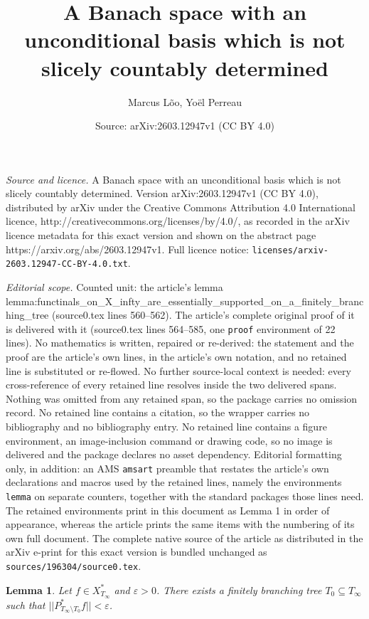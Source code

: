 \documentclass[10pt,a4paper]{amsart}
\title{A Banach space with an unconditional basis which is not slicely countably determined}
\author{Marcus L\~oo, Yo\"el Perreau}
\date{Source: arXiv:2603.12947v1 (CC BY 4.0)}
\newtheorem{lemma}{Lemma}
\begin{document}
\maketitle

\noindent\emph{Source and licence.} A Banach space with an unconditional basis which is not slicely countably determined. Version arXiv:2603.12947v1 (CC BY 4.0), distributed by arXiv under the Creative Commons Attribution 4.0 International licence, http://creativecommons.org/licenses/by/4.0/, as recorded in the arXiv licence metadata for this exact version and shown on the abstract page https://arxiv.org/abs/2603.12947v1. Full licence notice: \texttt{licenses/arxiv-2603.12947-CC-BY-4.0.txt}.\par\smallskip

\noindent\textit{Editorial scope.} Counted unit: the article's lemma lemma:functinals\_on\_X\_infty\_are\_essentially\_supported\_on\_a\_finitely\_branching\_tree (source0.tex lines 560--562). The article's complete original proof of it is delivered with it (source0.tex lines 564--585, one \texttt{proof} environment of 22 lines). No mathematics is written, repaired or re-derived: the statement and the proof are the article's own lines, in the article's own notation, and no retained line is substituted or re-flowed.  No further source-local context is needed: every cross-reference of every retained line resolves inside the two delivered spans.  Nothing was omitted from any retained span, so the package carries no omission record.  No retained line contains a citation, so the wrapper carries no bibliography and no bibliography entry.  No retained line contains a figure environment, an image-inclusion command or drawing code, so no image is delivered and the package declares no asset dependency.  Editorial formatting only, in addition: an AMS \texttt{amsart} preamble that restates the article's own declarations and macros used by the retained lines, namely the environments \texttt{lemma} on separate counters, together with the standard packages those lines need.  The retained environments print in this document as Lemma 1 in order of appearance, whereas the article prints the same items with the numbering of its own full document.  The complete native source of the article as distributed in the arXiv e-print for this exact version is bundled unchanged as \texttt{sources/196304/source0.tex}.
\begin{lemma}\label{lemma:functinals_on_X_infty_are_essentially_supported_on_a_finitely_branching_tree}
    Let $f\in X_{T_\infty}^*$ and $\varepsilon>0$. There exists a finitely branching tree $T_0\subseteq T_{\infty}$ such that $||P^{*}_{T_{\infty}\setminus T_0}f||<\varepsilon$.
\end{lemma}
\end{document}
